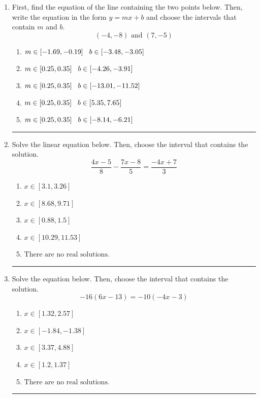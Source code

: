 \documentclass[14pt]{extbook}
\newcommand{\litem}[1]{\item#1\hspace*{-1cm}\rule{\textwidth}{0.4pt}}
\begin{document}
\begin{enumerate}
{\begin{enumerate}[label=\Alph*.]
\end{enumerate} }
\litem{
First, find the equation of the line containing the two points below. Then, write the equation in the form $ y=mx+b $ and choose the intervals that contain $m$ and $b$.\[ (-4, -8) \text{ and } (7, -5) \]\begin{enumerate}[label=\Alph*.]
\item \( m \in [-1.69, -0.19] \hspace*{3mm} b \in [-3.48, -3.05] \)
\item \( m \in [0.25, 0.35] \hspace*{3mm} b \in [-4.26, -3.91] \)
\item \( m \in [0.25, 0.35] \hspace*{3mm} b \in [-13.01, -11.52] \)
\item \( m \in [0.25, 0.35] \hspace*{3mm} b \in [5.35, 7.65] \)
\item \( m \in [0.25, 0.35] \hspace*{3mm} b \in [-8.14, -6.21] \)

\end{enumerate} }
\litem{
Solve the linear equation below. Then, choose the interval that contains the solution.\[ \frac{4x -5}{8} - \frac{7x -8}{5} = \frac{-4x + 7}{3} \]\begin{enumerate}[label=\Alph*.]
\item \( x \in [3.1, 3.26] \)
\item \( x \in [8.68, 9.71] \)
\item \( x \in [0.88, 1.5] \)
\item \( x \in [10.29, 11.53] \)
\item \( \text{There are no real solutions.} \)

\end{enumerate} }
\litem{
Solve the equation below. Then, choose the interval that contains the solution.\[ -16(6x -13) = -10(-4x -3) \]\begin{enumerate}[label=\Alph*.]
\item \( x \in [1.32, 2.57] \)
\item \( x \in [-1.84, -1.38] \)
\item \( x \in [3.37, 4.88] \)
\item \( x \in [1.2, 1.37] \)
\item \( \text{There are no real solutions.} \)


\end{enumerate}}
\end{enumerate}
\end{document}

